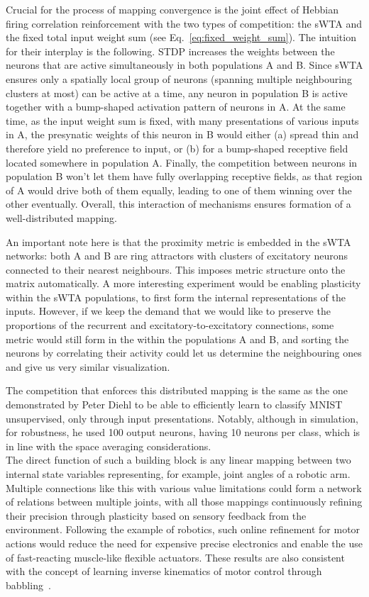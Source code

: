 Crucial for the process of mapping convergence is the joint effect of Hebbian firing correlation reinforcement with the two types of competition: the \ac{sWTA} and the fixed total input weight sum (see Eq.~\ref{eq:fixed_weight_sum}). The intuition for their interplay is the following. STDP increases the weights between the neurons that are active simultaneously in both populations A and B. Since sWTA ensures only a spatially local group of neurons (spanning multiple neighbouring clusters at most) can be active at a time, any neuron in population B is active together with a bump-shaped activation pattern of neurons in A. At the same time, as the input weight sum is fixed, with many presentations of various inputs in A, the presynatic weights of this neuron in B would either (a) spread thin and therefore yield no preference to input, or (b) for a bump-shaped receptive field located somewhere in population A. Finally, the competition between neurons in population B won't let them have fully overlapping receptive fields, as that region of A would drive both of them equally, leading to one of them winning over the other eventually. Overall, this interaction of mechanisms ensures formation of a well-distributed mapping.

An important note here is that the proximity metric is embedded in the sWTA networks: both A and B are ring attractors with clusters of excitatory neurons connected to their nearest neighbours. This imposes metric structure onto the matrix automatically. A more interesting experiment would be enabling plasticity within the sWTA populations, to first form the internal representations of the inputs. However, if we keep the demand that we would like to preserve the proportions of the recurrent and excitatory-to-excitatory connections, some metric would still form in the within the populations A and B, and sorting the neurons by correlating their activity could let us determine the neighbouring ones and give us very similar visualization.

The competition that enforces this distributed mapping is the same as the one demonstrated by Peter Diehl \cite{Diehl_Cook15} to be able to efficiently learn to classify MNIST unsupervised, only through input presentations. Notably, although in simulation, for robustness, he used 100 output neurons, having 10 neurons per class, which is in line with the space averaging considerations.\\

The direct function of such a building block is any linear mapping between two internal state variables representing, for example, joint angles of a robotic arm. Multiple connections like this with various value limitations could form a network of relations between multiple joints, with all those mappings continuously refining their precision through plasticity based on sensory feedback from the environment. Following the example of robotics, such online refinement for motor actions would reduce the need for expensive precise electronics and enable the use of fast-reacting muscle-like flexible actuators. These results are also consistent with the concept of learning inverse kinematics of motor control through babbling~\cite{Zhao_etal20}.

